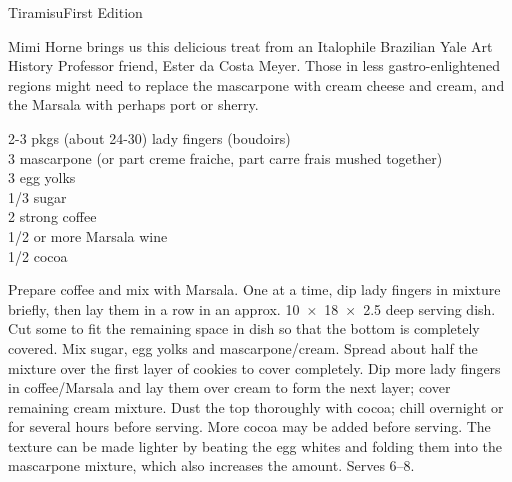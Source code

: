 \begin{entry}{Tiramisu}{First Edition}

\begin{open}
  Mimi Horne brings us this delicious treat from an Italophile Brazilian Yale
  Art History Professor friend, Ester da Costa Meyer.  Those in less
  gastro-enlightened regions might need to replace the mascarpone with cream
  cheese and cream, and the Marsala with perhaps port or sherry.
\end{open}
\begin{ingredients}
  2-3 pkgs (about 24-30) lady fingers (boudoirs) \\
  \SI{3}{\cup} mascarpone (or part creme fraiche, part carre frais mushed together)\\
  3 egg yolks \\
  \SI{1/3}{\cup} sugar \\
  \SI{2}{\cup} strong coffee \\
  \SI{1/2}{\cup} or more Marsala wine \\
  \SI{1/2}{\cup} cocoa
\end{ingredients}
Prepare coffee and mix with Marsala. One at a time, dip lady fingers in
mixture briefly, then lay them in a row in an approx. \SI{10x18x2.5}{\inch}
deep serving dish.  Cut some to fit the remaining space in dish so that the
bottom is completely covered. Mix sugar, egg yolks and
mascarpone/cream. Spread about half the mixture over the first layer of
cookies to cover completely.  Dip more lady fingers in coffee/Marsala and lay
them over cream to form the next layer; cover remaining cream mixture. Dust
the top thoroughly with cocoa; chill overnight or for several hours before
serving. More cocoa may be added before serving. The texture can be made
lighter by beating the egg whites and folding them into the mascarpone
mixture, which also increases the amount.  Serves \numrange{6}{8}.
\end{entry}

